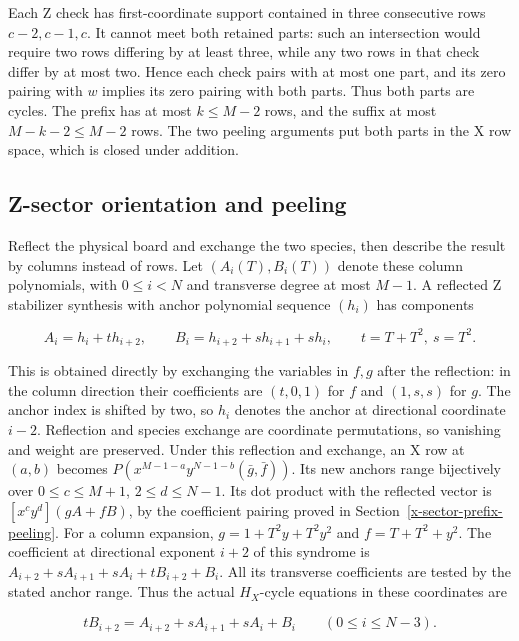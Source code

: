 \documentclass{article}
\begin{document}
Each Z check has first-coordinate support contained in three consecutive
rows \(c-2,c-1,c\). It cannot meet both retained parts: such an
intersection would require two rows differing by at least three, while
any two rows in that check differ by at most two. Hence each check pairs
with at most one part, and its zero pairing with \(w\) implies its zero
pairing with both parts. Thus both parts are cycles. The prefix has at
most \(k\le M-2\) rows, and the suffix at most \(M-k-2\le M-2\) rows.
The two peeling arguments put both parts in the X row space, which is
closed under addition.

\subsection{Z-sector orientation and
peeling}\label{z-sector-orientation-and-peeling}

Reflect the physical board and exchange the two species, then describe
the result by columns instead of rows. Let \((A_i(T),B_i(T))\) denote
these column polynomials, with \(0\le i<N\) and transverse degree at
most \(M-1\). A reflected Z stabilizer synthesis with anchor polynomial
sequence \((h_i)\) has components

\begin{equation}
 A_i=h_i+t h_{i+2},\qquad
 B_i=h_{i+2}+s h_{i+1}+s h_i,
 \qquad t=T+T^2,\ s=T^2.
\end{equation}

This is obtained directly by exchanging the variables in \(f,g\) after
the reflection: in the column direction their coefficients are
\((t,0,1)\) for \(f\) and \((1,s,s)\) for \(g\). The anchor index is
shifted by two, so \(h_i\) denotes the anchor at directional coordinate
\(i-2\). Reflection and species exchange are coordinate permutations, so
vanishing and weight are preserved. Under this reflection and exchange,
an X row at \((a,b)\) becomes
\(P(x^{M-1-a}y^{N-1-b}(\bar g,\bar f))\). Its new anchors range
bijectively over \(0\le c\le M+1\), \(2\le d\le N-1\).
Its dot product with the reflected vector is
\([x^cy^d](gA+fB)\), by the coefficient pairing proved in
Section~\ref{x-sector-prefix-peeling}.
For a column expansion, \(g=1+T^2y+T^2y^2\) and
\(f=T+T^2+y^2\). The coefficient at directional exponent \(i+2\)
of this syndrome is
\(A_{i+2}+sA_{i+1}+sA_i+tB_{i+2}+B_i\).
All its transverse coefficients are tested by the stated anchor range.
Thus the actual \(H_X\)-cycle equations in these coordinates are

\begin{equation}\label{eq:z-cycle}
 tB_{i+2}=A_{i+2}+sA_{i+1}+sA_i+B_i
 \qquad(0\le i\le N-3).
\end{equation}
\end{document}
